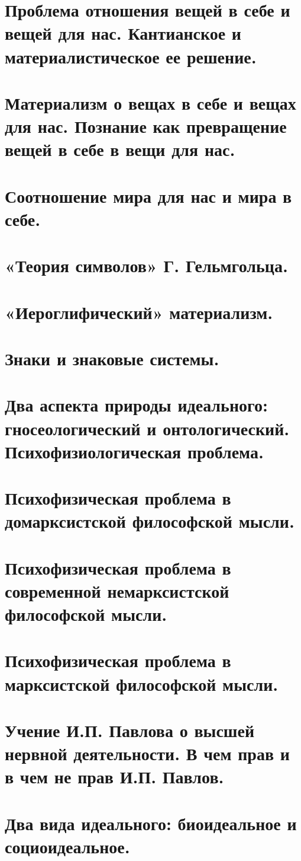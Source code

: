 \section{ Проблема отношения вещей в себе и вещей для нас. Кантианское и материалистическое ее решение.}
\section{ Материализм о вещах в себе и вещах для нас. Познание как превращение вещей в себе в вещи для нас.}
\section{ Соотношение мира для нас и мира в себе.}
\section{ «Теория символов» Г. Гельмгольца.}
\section{ «Иероглифический» материализм.}
\section{ Знаки и знаковые системы.}
\section{ Два аспекта природы идеального: гносеологический и онтологический. Психофизиологическая проблема.}
\section{ Психофизическая проблема в домарксистской философской мысли.}
\section{ Психофизическая проблема в современной немарксистской философской мысли.}
\section{ Психофизическая проблема в марксистской философской мысли.}
\section{ Учение И.П. Павлова о высшей нервной деятельности. В чем прав и в чем не прав И.П. Павлов.}
\section{ Два вида идеального: биоидеальное и социоидеальное.}
